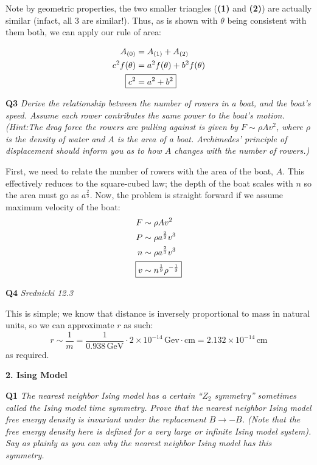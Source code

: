 \documentclass[10pt]{article}
\begin{document}
Note by geometric properties, the two smaller triangles (\textbf{(1)} and \textbf{(2)}) are actually similar (infact, all 3 are similar!). Thus, as is shown with $\theta$ being consistent with them both, we can apply our rule of area:

\[
\begin{aligned}
  A_{(0)} & = A_{(1)} + A_{(2)} \\
  c^{2}f(\theta) & = a^{2}f(\theta) + b^{2}f(\theta) \\
  \Aboxed{c^{2} & = a^{2} + b^{2}}
\end{aligned}
\]

\textbf{Q3} \textit{Derive the relationship between the number of rowers in a boat, and the boat’s speed. Assume each rower contributes the same power to the boat’s motion. (Hint:The drag force the rowers are pulling against is given by $F \sim \rho A v^{2}$, where $\rho$ is the density of water and $A$ is the area of a boat. Archimedes’ principle of displacement should inform you as to how $A$ changes with the number of rowers.)}

First, we need to relate the number of rowers with the area of the boat, $A$. This effectively reduces to the square-cubed law; the depth of the boat scales with $n$ so the area must go as $a^{\frac{2}{3}}$. Now, the problem is straight forward if we assume maximum velocity of the boat:
\[
\begin{aligned}
  F & \sim \rho Av^{2} \\
  P & \sim \rho a^{\frac{2}{3}}v^{3} \\
  n & \sim \rho a^{\frac{2}{3}}v^{3} \\
  \Aboxed{v & \sim n^{\frac{1}{9}}\rho^{-\frac{1}{3}}}
\end{aligned}
\]

\textbf{Q4} \textit{Srednicki 12.3}

This is simple; we know that distance is inversely proportional to mass in natural units, so we can approximate $r$ as such:
\[ r \sim \frac{1}{m} = \frac{1}{0.938\, \text{GeV}}\cdot 2\times10^{-14}\,\text{Gev}\cdot\text{cm} = 2.132\times10^{-14}\,\text{cm} \]
as required.

\textbf{\Large 2. Ising Model}

\textbf{Q1} \textit{The nearest neighbor Ising model has a certain “$Z_{2}$ symmetry” sometimes called the Ising model time symmetry. Prove that the nearest neighbor Ising model free energy density is invariant under the replacement $B \to -B$. (Note that the free energy density here is defined for a very large or infinite Ising model system). Say as plainly as you can why the nearest neighbor Ising model has this symmetry.}
\end{document}
